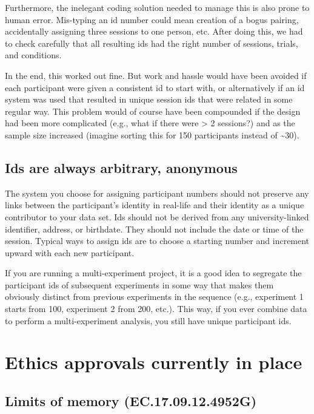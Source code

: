\documentclass[12pt,]{book}
\theoremstyle{definition}
\theoremstyle{definition}
\theoremstyle{definition}
\theoremstyle{remark}
\begin{document}
Furthermore, the inelegant coding solution needed to manage this is also
prone to human error. Mis-typing an id number could mean creation of a
bogus pairing, accidentally assigning three sessions to one person, etc.
After doing this, we had to check carefully that all resulting ids had
the right number of sessions, trials, and conditions.

In the end, this worked out fine. But work and hassle would have been
avoided if each participant were given a consistent id to start with, or
alternatively if an id system was used that resulted in unique session
ids that were related in some regular way. This problem would of course
have been compounded if the design had been more complicated (e.g., what
if there were \textgreater{} 2 sessions?) and as the sample size
increased (imagine sorting this for 150 participants instead of
\textasciitilde{}30).

\subsection{Ids are always arbitrary,
anonymous}\label{ids-are-always-arbitrary-anonymous}

The system you choose for assigning participant numbers should not
preserve any links between the participant's identity in real-life and
their identity as a unique contributor to your data set. Ids should not
be derived from any university-linked identifier, address, or birthdate.
They should not include the date or time of the session. Typical ways to
assign ids are to choose a starting number and increment upward with
each new participant.

If you are running a multi-experiment project, it is a good idea to
segregate the participant ids of subsequent experiments in some way that
makes them obviously distinct from previous experiments in the sequence
(e.g., experiment 1 starts from 100, experiment 2 from 200, etc.). This
way, if you ever combine data to perform a multi-experiment analysis,
you still have unique participant ids.

\hypertarget{ethics-approvals-currently-in-place}{\section{Ethics
approvals currently in
place}\label{ethics-approvals-currently-in-place}}

\subsection{Limits of memory
(EC.17.09.12.4952G)}\label{limits-of-memory-ec.17.09.12.4952g}
\end{document}
